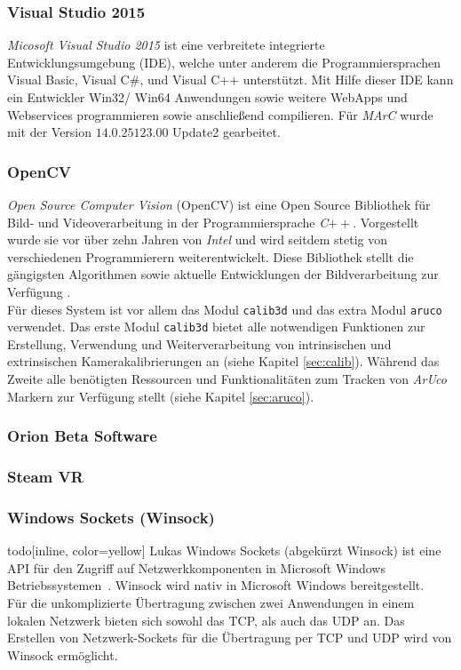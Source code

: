 \subsubsection{Visual Studio 2015}\label{sec:VisualStudio} 

\textit{Micosoft Visual Studio 2015} ist eine verbreitete integrierte Entwicklungsumgebung (IDE), welche unter anderem die Programmiersprachen Visual Basic, Visual C$\#$, und Visual C++ unterstützt. Mit Hilfe dieser IDE kann ein Entwickler Win32/ Win64 Anwendungen sowie weitere WebApps und Webservices \cite{website:VisuStud} programmieren sowie anschließend compilieren. Für \textit{MArC} wurde mit der Version $14.0.25123.00$ Update2 gearbeitet.

\subsubsection{OpenCV} \label{sec:OpenCV} 
\textit{Open Source Computer Vision} (OpenCV) ist eine Open Source Bibliothek für Bild- und Videoverarbeitung in der Programmiersprache \textit{C}$++$. Vorgestellt wurde sie vor über zehn Jahren von \textit{Intel} und wird seitdem stetig von verschiedenen Programmierern weiterentwickelt. Diese Bibliothek stellt die gängigsten Algorithmen sowie aktuelle Entwicklungen der Bildverarbeitung zur Verfügung
\cite{article:OpenCV}.\\
Für dieses System ist vor allem das Modul \texttt{calib3d} \cite{website:Calib3dDoc} und das extra Modul \texttt{aruco} \cite{website:ArucoDoc} verwendet. Das erste Modul \texttt{calib3d}  bietet alle notwendigen Funktionen zur Erstellung, Verwendung und Weiterverarbeitung von intrinsischen und extrinsischen Kamerakalibrierungen an (siehe Kapitel \ref{sec:calib}). Während das Zweite alle benötigten Ressourcen und Funktionalitäten zum Tracken von \textit{ArUco} Markern zur Verfügung stellt (siehe Kapitel \ref{sec:aruco}).

\subsubsection{Orion Beta Software} \label{OBS}

\subsubsection{Steam VR}
\subsubsection{Windows Sockets (Winsock)}\label{sec:Winsock}todo[inline, color=yellow] {Lukas}
Windows Sockets (abgekürzt Winsock) ist eine API für den Zugriff auf Netzwerkkomponenten in Microsoft Windows Betriebssystemen~\cite{quinn1998windows}. Winsock wird nativ in Microsoft Windows bereitgestellt.\\ 
Für die unkomplizierte Übertragung zwischen zwei Anwendungen in einem lokalen Netzwerk bieten sich sowohl das TCP, als auch das UDP an. Das Erstellen von Netzwerk-Sockets für die Übertragung per TCP und UDP wird von Winsock ermöglicht.\\ 
\newpage